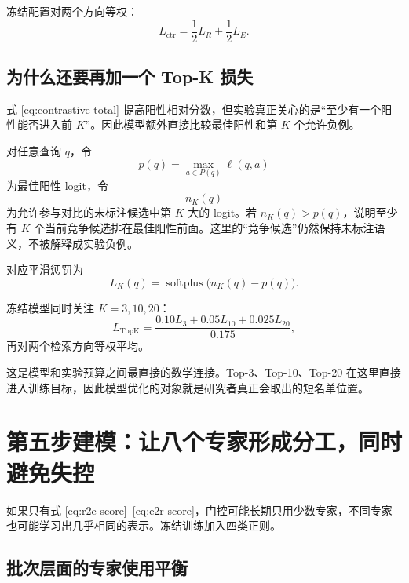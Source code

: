 \documentclass[UTF8,11pt,a4paper]{ctexart}
\newcommand{\softplus}{\operatorname{softplus}}
\begin{document}
冻结配置对两个方向等权：
\begin{equation}
L_{\mathrm{ctr}}
=
\frac12L_R+\frac12L_E.
\label{eq:contrastive-total}
\end{equation}

\subsection{为什么还要再加一个 Top-K 损失}

式 \eqref{eq:contrastive-total} 提高阳性相对分数，但实验真正关心的是“至少有一个阳性能否进入前 $K$”。因此模型额外直接比较最佳阳性和第 $K$ 个允许负例。

对任意查询 $q$，令
\begin{equation}
p(q)=\max_{a\in P(q)}\ell(q,a)
\end{equation}
为最佳阳性 logit，令
\begin{equation}
n_K(q)
\end{equation}
为允许参与对比的未标注候选中第 $K$ 大的 logit。若 $n_K(q)>p(q)$，说明至少有 $K$ 个当前竞争候选排在最佳阳性前面。这里的“竞争候选”仍然保持未标注语义，不被解释成实验负例。

对应平滑惩罚为
\begin{equation}
L_K(q)=\softplus\big(n_K(q)-p(q)\big).
\label{eq:topk-one}
\end{equation}

冻结模型同时关注 $K=3,10,20$：
\begin{equation}
L_{\mathrm{TopK}}
=
\frac{
0.10L_3+0.05L_{10}+0.025L_{20}
}{0.175},
\label{eq:topk-combine}
\end{equation}
再对两个检索方向等权平均。

\begin{keybox}
这是模型和实验预算之间最直接的数学连接。Top-3、Top-10、Top-20 在这里直接进入训练目标，因此模型优化的对象就是研究者真正会取出的短名单位置。
\end{keybox}

\section{第五步建模：让八个专家形成分工，同时避免失控}

如果只有式 \eqref{eq:r2e-score}--\eqref{eq:e2r-score}，门控可能长期只用少数专家，不同专家也可能学习出几乎相同的表示。冻结训练加入四类正则。

\subsection{批次层面的专家使用平衡}
\end{document}
